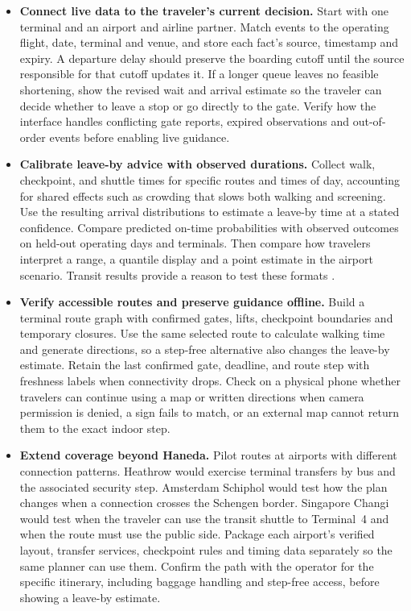 \documentclass[sigconf,nonacm,balance=false]{acmart}
\begin{document}
\begin{itemize}
\item \textbf{Connect live data to the traveler’s current decision.} Start with one terminal and an airport and airline partner. Match events to the operating flight, date, terminal and venue, and store each fact's source, timestamp and expiry. A departure delay should preserve the boarding cutoff until the source responsible for that cutoff updates it. If a longer queue leaves no feasible shortening, show the revised wait and arrival estimate so the traveler can decide whether to leave a stop or go directly to the gate. Verify how the interface handles conflicting gate reports, expired observations and out-of-order events before enabling live guidance.

\item \textbf{Calibrate leave-by advice with observed durations.} Collect walk, checkpoint, and shuttle times for specific routes and times of day, accounting for shared effects such as crowding that slows both walking and screening. Use the resulting arrival distributions to estimate a leave-by time at a stated confidence. Compare predicted on-time probabilities with observed outcomes on held-out operating days and terminals. Then compare how travelers interpret a range, a quantile display and a point estimate in the airport scenario. Transit results provide a reason to test these formats \cite{ref8}.

\item \textbf{Verify accessible routes and preserve guidance offline.} Build a terminal route graph with confirmed gates, lifts, checkpoint boundaries and temporary closures. Use the same selected route to calculate walking time and generate directions, so a step-free alternative also changes the leave-by estimate. Retain the last confirmed gate, deadline, and route step with freshness labels when connectivity drops. Check on a physical phone whether travelers can continue using a map or written directions when camera permission is denied, a sign fails to match, or an external map cannot return them to the exact indoor step.

\item \textbf{Extend coverage beyond Haneda.} Pilot routes at airports with different connection patterns. Heathrow would exercise terminal transfers by bus and the associated security step. Amsterdam Schiphol would test how the plan changes when a connection crosses the Schengen border. Singapore Changi would test when the traveler can use the transit shuttle to Terminal~4 and when the route must use the public side. Package each airport's verified layout, transfer services, checkpoint rules and timing data separately so the same planner can use them. Confirm the path with the operator for the specific itinerary, including baggage handling and step-free access, before showing a leave-by estimate.


\end{itemize}
\end{document}
